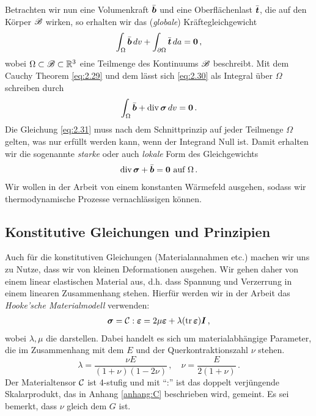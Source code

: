 Betrachten wir nun eine Volumenkraft $\bar{\boldsymbol b}$ und eine Oberflächenlast $\bar{\boldsymbol t}$, die auf den Körper $\mathscr B$ wirken, so erhalten wir das (\textit{globale}) Kräftegleichgewicht
\begin{align}\label{eq:2.30}
	\int_{\Omega} \bar{\boldsymbol b} \, dv + \int_{\partial \Omega} \bar{\boldsymbol t} \, da = \boldsymbol 0 \, ,
\end{align}
wobei $\Omega \subset \mathscr B \subset \mathbb{R}^3$ eine Teilmenge des Kontinuums $\mathscr B$ beschreibt. Mit dem Cauchy Theorem \eqref{eq:2.29} und dem  lässt sich \eqref{eq:2.30} als Integral über $\Omega$ schreiben durch
\begin{align}\label{eq:2.31}
	\int_{\Omega} \bar{\boldsymbol b} + \operatorname{div} \boldsymbol\sigma \, dv = \boldsymbol 0 \, .
\end{align}
Die Gleichung \eqref{eq:2.31} muss nach dem Schnittprinzip auf jeder Teilmenge $\Omega$ gelten, was nur erfüllt werden kann, wenn der Integrand Null ist. Damit erhalten wir die sogenannte \textit{starke} oder auch \textit{lokale} Form des Gleichgewichts
\begin{align}\label{eq:2.32}
	\operatorname{div} \boldsymbol \sigma + \bar{\boldsymbol b} = \boldsymbol 0 \text{ auf } \Omega \, .
\end{align}
Wir wollen in der Arbeit von einem konstanten Wärmefeld ausgehen, sodass wir thermodynamische Prozesse vernachlässigen können.

\subsection{Konstitutive Gleichungen und Prinzipien}
\label{kap:2.5.3}


Auch für die konstitutiven Gleichungen (Materialannahmen etc.) machen wir uns zu Nutze, dass wir von kleinen Deformationen ausgehen. Wir gehen daher von einem linear elastischen Material aus, d.h. dass Spannung und Verzerrung in einem linearen Zusammenhang stehen. Hierfür werden wir in der Arbeit das \textit{Hooke'sche Materialmodell} verwenden:
\begin{align}\label{eq:2.33}
	\boldsymbol \sigma = \mathcal C :\boldsymbol {\varepsilon} = 2 \mu \boldsymbol {\varepsilon} + \lambda (\operatorname{tr} \boldsymbol {\varepsilon}) \boldsymbol I \, ,
\end{align}
wobei $\lambda, \mu$ die \textit{} darstellen. Dabei handelt es sich um materialabhängige Parameter, die im Zusammenhang mit dem  $E$ und der Querkontraktionszahl $\nu$ stehen.
\[
	\lambda = \frac{\nu E}{(1+\nu)(1-2\nu)} \, ,\quad \nu = \frac E{2(1+\nu)} \, .
\]
Der Materialtensor $\mathcal C$ ist 4-stufig und mit "`:"' ist das doppelt verjüngende Skalarprodukt, das in Anhang \ref{anhang:C} beschrieben wird, gemeint. Es sei bemerkt, dass $\nu$ gleich dem  $G$ ist.



